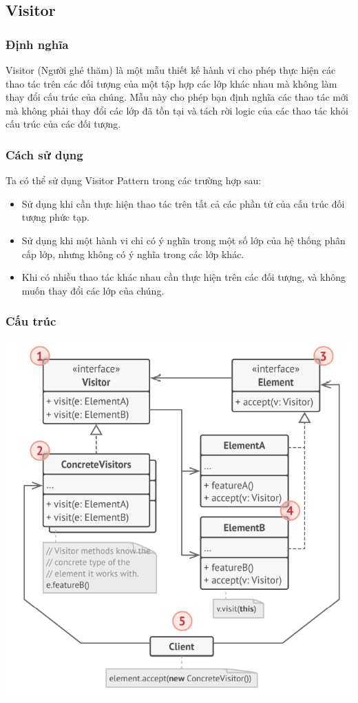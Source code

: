 \subsection{Visitor}
\subsubsection{Định nghĩa}
Visitor (Người ghé thăm) là một mẫu thiết kế hành vi cho phép thực hiện các thao tác trên các đối tượng của một tập hợp các lớp khác nhau mà không làm thay đổi cấu trúc của chúng. Mẫu này cho phép bạn định nghĩa các thao tác mới mà không phải thay đổi các lớp đã tồn tại và tách rời logic của các thao tác khỏi cấu trúc của các đối tượng.
\subsubsection{Cách sử dụng}
Ta có thể sử dụng Visitor Pattern trong các trường hợp sau:
\begin{itemize}
    \item Sử dụng khi cần thực hiện thao tác trên tất cả các phần tử của cấu trúc đối tượng phức tạp.
    \item Sử dụng khi một hành vi chỉ có ý nghĩa trong một số lớp của hệ thống phân cấp lớp, nhưng không có ý nghĩa trong các lớp khác.
    \item Khi có nhiều thao tác khác nhau cần thực hiện trên các đối tượng, và không muốn thay đổi các lớp của chúng.
\end{itemize}
\subsubsection{Cấu trúc}
\begin{center}
    \includegraphics[scale=0.6]{image/behavioral/visitor.png}
\end{center}
